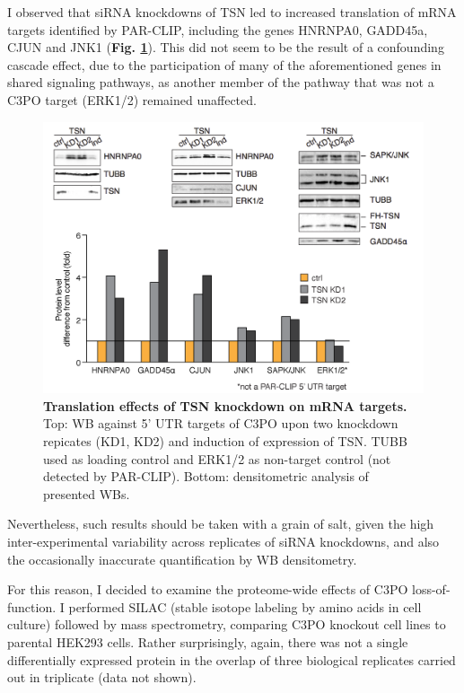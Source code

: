 \documentclass[12pt]{rockefeller}
\begin{document}
I observed that siRNA knockdowns of TSN led to increased translation of mRNA targets identified by PAR-CLIP, including the genes HNRNPA0, GADD45a, CJUN and JNK1 (\textbf{Fig. \ref{trnsl}}). This did not seem to be the result of a confounding cascade effect, due to the participation of many of the aforementioned genes in shared signaling pathways, as another member of the pathway that was not a C3PO target (ERK1/2) remained unaffected. 
  
\begin{figure}[!ht]%
\centering
\includegraphics[width=\textwidth]{Untitled.png} 
\caption[Translation effects of TSN knockdown on mRNA targets.]
{
\textbf{Translation effects of TSN knockdown on mRNA targets.}
Top: WB against 5' UTR targets of C3PO upon two knockdown repicates (KD1, KD2) and induction of expression of TSN. TUBB used as loading control and ERK1/2 as non-target control (not detected by PAR-CLIP). Bottom: densitometric analysis of presented WBs.
}
\centering
\label{trnsl}%
\end{figure}

Nevertheless, such results should be taken with a grain of salt, given the high inter-experimental variability across replicates of siRNA knockdowns, and also the occasionally inaccurate quantification by WB densitometry. 

For this reason, I decided to examine the proteome-wide effects of C3PO loss-of-function. I performed SILAC (stable isotope labeling by amino acids in cell culture) followed by mass spectrometry, comparing C3PO knockout cell lines to parental HEK293 cells. Rather surprisingly, again, there was not a single differentially expressed protein in the overlap of three biological replicates carried out in triplicate (data not shown).
\end{document}

